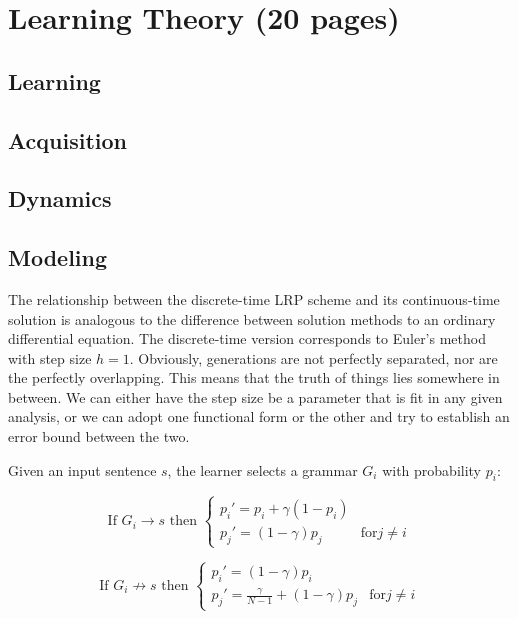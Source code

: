 \chapter{Learning Theory (20 pages)}
\label{learning-theory}

\section{Learning}

\section{Acquisition}

\section{Dynamics}

\section{Modeling}

The relationship between the discrete-time LRP scheme and its continuous-time solution is analogous to the difference between solution methods to an ordinary differential equation. The discrete-time version corresponds to Euler's method with step size $h=1$. Obviously, generations are not perfectly separated, nor are the perfectly overlapping. This means that the truth of things lies somewhere in between. We can either have the step size be a parameter that is fit in any given analysis, or we can adopt one functional form or the other and try to establish an error bound between the two.


Given an input sentence $s$, the learner selects a grammar $G_i$ with probability $p_i$:


\begin{equation}
 \mbox{If $G_i \rightarrow s$ then }
\left\{
	\begin{array}{ll}
		p_i'  = p_i + \gamma (1-p_i)\\
		p_j'  = (1-\gamma)p_j & \mbox{for} j \neq i
	\end{array}
\right.
\end{equation}

\begin{equation}
 \mbox{If $G_i \nrightarrow s$ then }
\left\{
	\begin{array}{ll}
		p_i'  = (1-\gamma ) p_i \\
		p_j'  = \frac{\gamma}{N - 1} + (1-\gamma)p_j & \mbox{for} j \neq i
	\end{array}
\right.
\end{equation}


